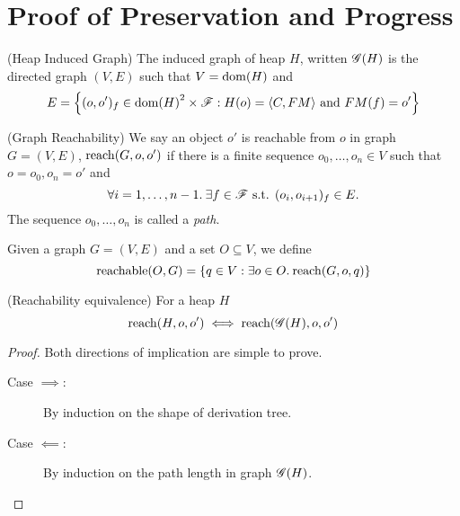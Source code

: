 \chapter{Proof of Preservation and Progress}
\label{proof_of_pnp}

\begin{definition}{(Heap Induced Graph)}
  The induced graph of heap $H$, written $\mathscr{G}{(H)}$ is the directed graph
  $(V, E)$ such that $V = \mbox{$\mathrm{dom}$}{(H)}$ and 
  \begin{equation}
    E = \left\{ (o, o')_f \in \mbox{$\mathrm{dom}$}{(H)}^2 \times \mathscr{F}: 
      H(o) = \mbox{$\langle C, FM \rangle$} \text{ and } FM(f) = o'
    \right\}
  \end{equation}
\end{definition}

\begin{definition}{(Graph Reachability)}
  We say an object $o'$ is reachable from $o$ in graph $G = (V,
  E)$, $\mbox{$\mathrm{reach}$}{(G, o, o')}$ if there is a finite sequence $o_0, \dots,
  o_n \in V$ such that $o = o_0, o_n = o'$ and
  \begin{equation}
    \forall i = 1,\dots, n-1. \: \exists f \in \mathscr{F} \text{ s.t. } (o_i,
    o_{i+1})_f \in E.
  \end{equation}
  The sequence $o_0, \dots, o_n$ is called a \emph{path}.
\end{definition}

\begin{definition}
  Given a graph $G = (V, E)$ and a set $O \subseteq V$, we define
  \begin{equation}
    \mbox{$\mathrm{reachable}$}{(O, G)} = \left\{ q \in V: \exists o\in O.\: \mbox{$\mathrm{reach}$}{(G, o, q)}
    \right\} \notag
  \end{equation}
\end{definition}

\begin{proposition}{(Reachability equivalence)}
  \label{prop:reacheq}
  For a heap $H$ 
  \begin{equation}
    \mbox{$\mathrm{reach}$}{(H, o, o')} \iff \mbox{$\mathrm{reach}$}{(\ensuremath{\mathscr{G}}{(H)}, o, o')}
  \end{equation}
\end{proposition}

\begin{proof}
  Both directions of implication are simple to prove.
  \begin{description}
    \item[Case $\implies$:] By induction on the shape of derivation tree.
    \item[Case $\impliedby$:] By induction on the path length in graph
      $\mathscr{G}{(H)}$.
  \end{description}
\end{proof}

